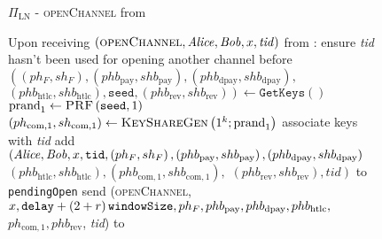   \begin{figure}[H]
    \begin{protocolbox}{$\Pi_{\mathrm{LN}}$ - \textsc{openChannel} from
    \environment}
      \begin{algorithmic}[1]
        \State Upon receiving $\left(\textsc{openChannel}, \mathit{Alice}, \mathit{Bob}, x,
        \mathit{tid}\right)$ from \environment:
        \Indent
          \State ensure \textit{tid} hasn't been used for opening another
          channel before
          \label{alg:protocol:open:env:valid}
          \State $\left(\left(ph_F, sh_F\right), \left(phb_{\mathrm{pay}},
          shb_{\mathrm{pay}}\right), \left(phb_{\mathrm{dpay}},
          shb_{\mathrm{dpay}}\right),\right.$ $\left.\left(phb_{\mathrm{htlc}},
          shb_{\mathrm{htlc}}\right), \mathtt{seed}, \left(phb_{\mathrm{rev}},
          shb_{\mathrm{rev}}\right)\right) \gets \texttt{GetKeys}\left(\right)$
          \State $\mathrm{prand}_1 \gets \textsc{PRF}\left(\mathtt{seed},
          1\right)$
          \label{alg:protocol:open:env:prf}
          \State $\left(ph_{\mathrm{com}, 1}, sh_{\mathrm{com}, 1}\right) \gets
          \textsc{KeyShareGen}\left(1^k; \mathrm{prand}_1\right)$
          \State associate keys with \textit{tid}
          \State add $\left(\mathit{Alice}, \mathit{Bob}, x, \mathtt{tid}, \left(ph_F,
          sh_F\right), \left(phb_{\mathrm{pay}}, shb_{\mathrm{pay}}\right),
          \left(phb_{\mathrm{dpay}}, shb_{\mathrm{dpay}}\right)\right.$
          $\left.\left(phb_{\mathrm{htlc}}, shb_{\mathrm{htlc}}\right),
          \left(phb_{\mathrm{com}, 1}, shb_{\mathrm{com}, 1}\right),\right.$
          $\left.\left(phb_{\mathrm{rev}}, shb_{\mathrm{rev}}\right),
          \mathit{tid}\right)$ to \texttt{pendingOpen}
          \label{alg:protocol:open:env:pendingOpen}
          \State send (\textsc{openChannel}, $x, \mathtt{delay} + \left(2 + r\right)\texttt{windowSize},
          ph_F, phb_{\mathrm{pay}}, phb_{\mathrm{dpay}}, phb_{\mathrm{htlc}},$
          $ph_{\mathrm{com}, 1}, phb_{\mathrm{rev}}$, \textit{tid}) to \bob{}
        \EndIndent
      \end{algorithmic}
    \end{protocolbox}
    \caption{}
    \label{alg:protocol:open:env}
  \end{figure}

